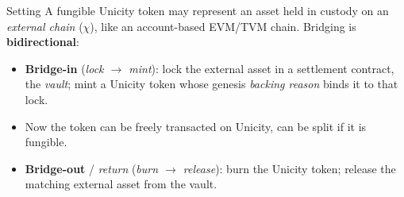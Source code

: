 \documentclass[aspectratio=169,10pt]{beamer}
\begin{document}
\begin{frame}{Setting}
A fungible Unicity token may represent an asset held in custody on an
\emph{external chain} ($\chi$), like an account-based EVM/TVM chain. Bridging is
\textbf{bidirectional}:
\begin{itemize}
  \item \textbf{Bridge-in} (\emph{lock $\to$ mint}): lock the external asset in a
        settlement contract, the \emph{vault}; mint a Unicity token whose genesis
        \emph{backing reason} binds it to that lock.
  \item Now the token can be freely transacted on Unicity, can be split if it is fungible.
  \item \textbf{Bridge-out} / \emph{return} (\emph{burn $\to$ release}): burn the
        Unicity token; release the matching external asset from the vault.
\end{itemize}
\end{frame}
\end{document}
